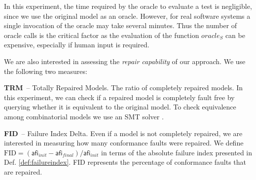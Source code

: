 \begin{tikzborder}{\cite{Gargantini16:validation}}
\begin{tikzborder}{\cite{gargantini_combinatorial_2017}}
\begin{tikzborder}{\cite{gargantini_combinatorial_2017}}
In this experiment, the time required by the oracle to evaluate a test is negligible, since we use the original model as an oracle. However, for real software systems a single invocation of the 	oracle may take several minutes. Thus the number of oracle calls is 	the critical factor as the evaluation of the function $\mathit{oracle}_{S}$ can be 	expensive, especially if human input is required.

\smallskip
\noindent We are also interested in assessing the \emph{repair capability} of our approach. We use the following two measures:
\be

\begin{compactdesc}
	
	\newcommand{\TRM}{\textbf{TRM}\xspace}
	\newcommand{\FID}{\textbf{FID}\xspace}
	
	\item[\TRM\ -- Totally Repaired Models.] The ratio of completely repaired models. 
	In this experiment, we can check if a repaired model is completely fault free by querying whether it is equivalent to the original  model. To check equivalence among combinatorial models we use an SMT solver \cite{Arcaini2014}.
	
	\item[\FID\ -- Failure Index Delta.] Even if a model is not completely repaired, we are interested in measuring how many conformance faults were repaired. We define $\mathrm{FID} = (\mathsf{afi}_{init} - \mathsf{afi}_{final})/\mathsf{afi}_{init}$ in terms of the absolute failure index presented in Def. \ref{def:failureindex}. FID represents the percentage of conformance faults that are repaired.
	
\end{compactdesc}


\end{tikzborder}
\end{tikzborder}
\end{tikzborder}
